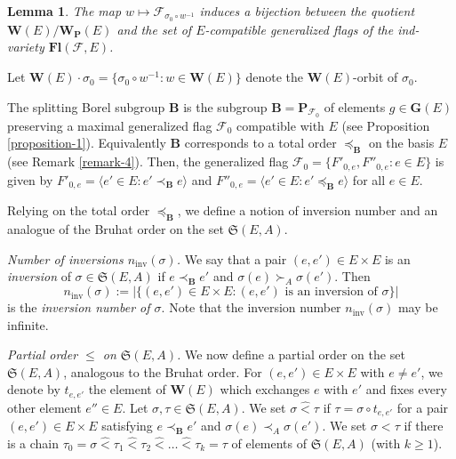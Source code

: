 \documentclass[12pt]{amsart}
\newtheorem{lemma}{Lemma}
\theoremstyle{definition}
\begin{document}
\begin{lemma}
\label{lemma-2-new}
The map $w\mapsto \mathcal{F}_{\sigma_0\circ w^{-1}}$ induces a bijection between the quotient $\mathbf{W}(E)/\mathbf{W}_\mathbf{P}(E)$ and the set of $E$-compatible generalized flags of the ind-variety $\mathbf{Fl}(\mathcal{F},E)$.
\end{lemma}

Let $\mathbf{W}(E)\cdot\sigma_0=\{\sigma_0\circ w^{-1}:w\in\mathbf{W}(E)\}$ denote the $\mathbf{W}(E)$-orbit of $\sigma_0$.

The splitting Borel subgroup $\mathbf{B}$ is the subgroup $\mathbf{B}=\mathbf{P}_{\mathcal{F}_0}$ of elements $g\in\mathbf{G}(E)$ preserving a maximal generalized flag $\mathcal{F}_0$ compatible with $E$ (see Proposition \ref{proposition-1}).
Equivalently $\mathbf{B}$ corresponds to a total order $\preceq_\mathbf{B}$ on the basis $E$ (see Remark \ref{remark-4}). Then, the generalized flag $\mathcal{F}_0=\{F'_{0,e},F''_{0,e}:e\in E\}$ is given by
$F'_{0,e}=\langle e'\in E:e'\prec_\mathbf{B}e\rangle$ and
$F''_{0,e}=\langle e'\in E:e'\preceq_\mathbf{B}e\rangle$ for all $e\in E$.

Relying on the total order $\preceq_\mathbf{B}$, we define a notion of inversion number and an analogue of the Bruhat order on the set $\mathfrak{S}(E,A)$.

{\it Number of inversions $n_\mathrm{inv}(\sigma)$.}
We say that a pair $(e,e')\in E\times E$ is an {\em inversion} of $\sigma\in\mathfrak{S}(E,A)$
if $e\prec_\mathbf{B}e'$ and $\sigma(e)\succ_A\sigma(e')$.
Then
\[n_\mathrm{inv}(\sigma):=|\{(e,e')\in E\times E:\mbox{$(e,e')$ is an inversion of $\sigma$}\}|\]
is the {\em inversion number of $\sigma$}.
Note that the inversion number $n_\mathrm{inv}(\sigma)$ may be infinite.

{\it Partial order $\leq$ on $\mathfrak{S}(E,A)$.}
We now define a partial order on the set $\mathfrak{S}(E,A)$, analogous to the Bruhat order.
For $(e,e')\in E\times E$ with $e\not=e'$, we denote by $t_{e,e'}$ the element of $\mathbf{W}(E)$ which exchanges $e$ with $e'$ and fixes every other element $e''\in E$.
Let $\sigma,\tau\in\mathfrak{S}(E,A)$.
We set $\sigma\hat{<}\tau$ if $\tau=\sigma\circ t_{e,e'}$ for a pair $(e,e')\in E\times E$ satisfying
$e\prec_\mathbf{B}e'$ and $\sigma(e)\prec_A\sigma(e')$.
We set $\sigma<\tau$ if there is a chain $\tau_0=\sigma\hat<\tau_1\hat<\tau_2\hat<\ldots\hat<\tau_k=\tau$ of elements of $\mathfrak{S}(E,A)$ (with $k\geq 1$).
\end{document}
